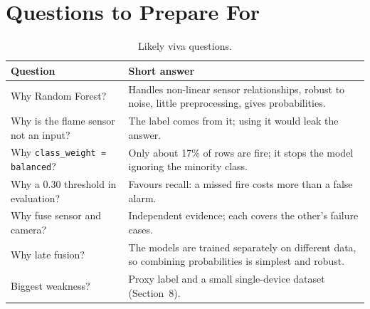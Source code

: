 \documentclass[12pt,a4paper]{article}
\begin{document}
\section{Questions to Prepare For}
\begin{table}[H]
\centering
\caption{Likely viva questions.}
\label{tab:qa}
\small
\begin{tabularx}{\textwidth}{>{\raggedright\arraybackslash}p{4.8cm} X}
\toprule
\textbf{Question} & \textbf{Short answer} \\
\midrule
Why Random Forest? & Handles non-linear sensor relationships, robust to noise, little preprocessing, gives probabilities. \\
Why is the flame sensor not an input? & The label comes from it; using it would leak the answer. \\
Why \texttt{class\_weight = balanced}? & Only about 17\% of rows are fire; it stops the model ignoring the minority class. \\
Why a 0.30 threshold in evaluation? & Favours recall: a missed fire costs more than a false alarm. \\
Why fuse sensor and camera? & Independent evidence; each covers the other's failure cases. \\
Why late fusion? & The models are trained separately on different data, so combining probabilities is simplest and robust. \\
Biggest weakness? & Proxy label and a small single-device dataset (Section~8). \\
\bottomrule
\end{tabularx}
\end{table}
\end{document}
